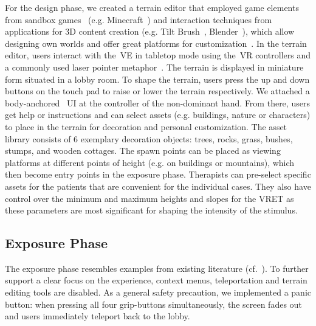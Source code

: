 For the design phase, we created a terrain editor that employed game elements from sandbox games~\cite{projectspark2014,frohlich2018,roo2017} (e.g. Minecraft~\cite{minecraft2009}) and interaction techniques from applications for 3D content creation (e.g. Tilt Brush~\cite{tiltbrush2016}, Blender~\cite{blender1998}), which allow designing own worlds and offer great platforms for customization~\cite{volkmar2020}.
In the terrain editor, users interact with the~\ac{VE} in tabletop mode using the~\ac{VR} controllers and a commonly used laser pointer metaphor~\cite{jerald2016, laviola2017}.
The terrain is displayed in miniature form situated in a lobby room. To shape the terrain, users press the up and down buttons on the touch pad to raise or lower the terrain respectively. We attached a body-anchored~\cite{alexandrovsky2020, rzayev2019} UI at the controller of the non-dominant hand. From there, users get help or instructions and can select assets (e.g. buildings, nature or characters) to place in the terrain for decoration and personal customization. The asset library consists of $6$ exemplary decoration objects: trees, rocks, grass, bushes, stumps, and wooden cottages. The spawn points can be placed as viewing platforms at different points of height (e.g. on buildings or mountains), which then become entry points in the exposure phase. Therapists can pre-select specific assets for the patients that are convenient for the individual cases. They also have control over the minimum and maximum heights and slopes for the \ac{VRET} as these parameters are most significant for shaping the intensity of the stimulus.


\subsection{Exposure Phase}
The exposure phase resembles examples from existing literature (cf.~\cite{emmelkamp2002, powers2008}). To further support a clear focus on the experience, context menus, teleportation and terrain editing tools are disabled. 
As a general safety precaution, we implemented a panic button: when pressing all four grip-buttons simultaneously, the screen fades out and users immediately teleport back to the lobby.

